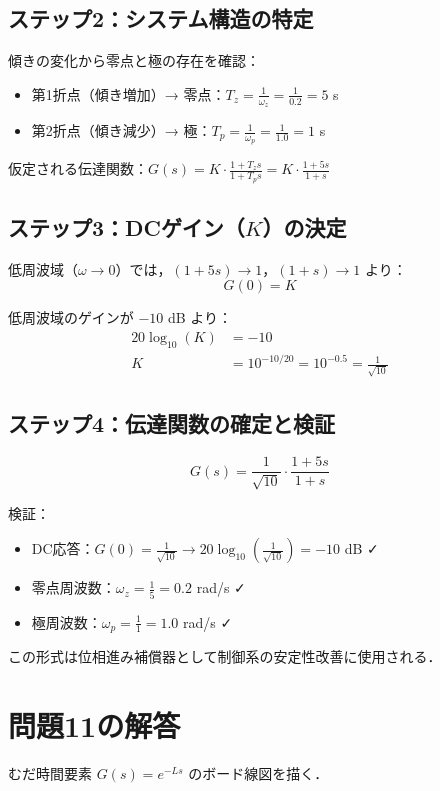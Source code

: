 \documentclass[11pt,a4paper]{ltjsarticle} %
\begin{document}
\subsection{ステップ2：システム構造の特定}
傾きの変化から零点と極の存在を確認：
\begin{itemize}
\item 第1折点（傾き増加）→ 零点：$T_z = \frac{1}{\omega_z} = \frac{1}{0.2} = 5$ s
\item 第2折点（傾き減少）→ 極：$T_p = \frac{1}{\omega_p} = \frac{1}{1.0} = 1$ s
\end{itemize}

仮定される伝達関数：$G(s) = K \cdot \frac{1+T_z s}{1+T_p s} = K \cdot \frac{1+5s}{1+s}$

\subsection{ステップ3：DCゲイン（$K$）の決定}
低周波域（$\omega \rightarrow 0$）では，$(1+5s) \rightarrow 1$，$(1+s) \rightarrow 1$ より：
\begin{equation}
G(0) = K
\end{equation}

低周波域のゲインが $-10$ dB より：
\begin{align}
20\log_{10}(K) &= -10 \\
K &= 10^{-10/20} = 10^{-0.5} = \frac{1}{\sqrt{10}}
\end{align}

\subsection{ステップ4：伝達関数の確定と検証}
\begin{equation}
G(s) = \frac{1}{\sqrt{10}} \cdot \frac{1+5s}{1+s}
\end{equation}

検証：
\begin{itemize}
\item DC応答：$G(0) = \frac{1}{\sqrt{10}} \rightarrow 20\log_{10}\left(\frac{1}{\sqrt{10}}\right) = -10$ dB ✓
\item 零点周波数：$\omega_z = \frac{1}{5} = 0.2$ rad/s ✓
\item 極周波数：$\omega_p = \frac{1}{1} = 1.0$ rad/s ✓
\end{itemize}

この形式は位相進み補償器として制御系の安定性改善に使用される．

\section{問題11の解答}
むだ時間要素 $G(s) = e^{-Ls}$ のボード線図を描く．
\end{document}
